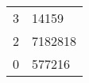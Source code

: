 \documentclass[letterpaper, 12pt]{article}
\begin{document}
\begin{tabular}{r@{.}l}
3 & 14159 \\
2 & 7182818\\
0 & 577216 \\
\end{tabular}
\end{document}
